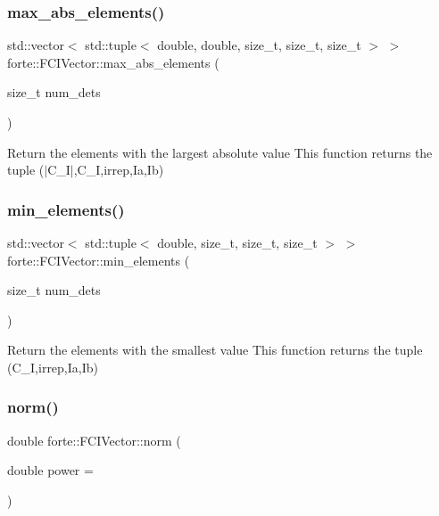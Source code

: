 \subsubsection{\texorpdfstring{max\+\_\+abs\+\_\+elements()}{max\_abs\_elements()}}
{\footnotesize\ttfamily std\+::vector$<$ std\+::tuple$<$ double, double, size\+\_\+t, size\+\_\+t, size\+\_\+t $>$ $>$ forte\+::\+F\+C\+I\+Vector\+::max\+\_\+abs\+\_\+elements (\begin{DoxyParamCaption}\item[{size\+\_\+t}]{num\+\_\+dets }\end{DoxyParamCaption})}

Return the elements with the largest absolute value This function returns the tuple ($\vert$\+C\+\_\+\+I$\vert$,C\+\_\+I,irrep,Ia,Ib) \mbox{\label{classforte_1_1_f_c_i_vector_ab0ee83d2f650fb39eb17e163f3191eca}} 
\subsubsection{\texorpdfstring{min\+\_\+elements()}{min\_elements()}}
{\footnotesize\ttfamily std\+::vector$<$ std\+::tuple$<$ double, size\+\_\+t, size\+\_\+t, size\+\_\+t $>$ $>$ forte\+::\+F\+C\+I\+Vector\+::min\+\_\+elements (\begin{DoxyParamCaption}\item[{size\+\_\+t}]{num\+\_\+dets }\end{DoxyParamCaption})}

Return the elements with the smallest value This function returns the tuple (C\+\_\+I,irrep,Ia,Ib) \mbox{\label{classforte_1_1_f_c_i_vector_aa3a4006628555ede48afd56c284c911a}} 
\subsubsection{\texorpdfstring{norm()}{norm()}}
{\footnotesize\ttfamily double forte\+::\+F\+C\+I\+Vector\+::norm (\begin{DoxyParamCaption}\item[{double}]{power = {} }\end{DoxyParamCaption})}

